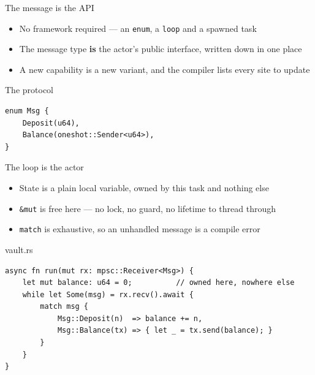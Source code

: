 \begin{frame}[fragile]{The message is the API}
  \begin{itemize}
    \item No framework required --- an \texttt{enum}, a \texttt{loop} and a spawned task
    \item The message type \textbf{is} the actor's public interface, written down in one place
    \item A new capability is a new variant, and the compiler lists every site to update
  \end{itemize}
  \begin{block}{The protocol}
\begin{lstlisting}
enum Msg {
    Deposit(u64),
    Balance(oneshot::Sender<u64>),
}
\end{lstlisting}
  \end{block}
\end{frame}

\begin{frame}[fragile]{The loop is the actor}
  \begin{itemize}
    \item State is a plain local variable, owned by this task and nothing else
    \item \texttt{\&mut} is free here --- no lock, no guard, no lifetime to thread through
    \item \texttt{match} is exhaustive, so an unhandled message is a compile error
  \end{itemize}
  \vspace{-0.4cm}
  \begin{block}{vault.rs}
\begin{lstlisting}
async fn run(mut rx: mpsc::Receiver<Msg>) {
    let mut balance: u64 = 0;          // owned here, nowhere else
    while let Some(msg) = rx.recv().await {
        match msg {
            Msg::Deposit(n)  => balance += n,
            Msg::Balance(tx) => { let _ = tx.send(balance); }
        }
    }
}
\end{lstlisting}
  \end{block}
\end{frame}

